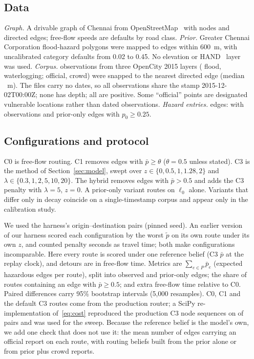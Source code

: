 \documentclass[conference]{IEEEtran}
\begin{document}
\subsection{Data}
\emph{Graph.} A drivable graph of Chennai from OpenStreetMap~\cite{haklay2008osm} with \NNodes{} nodes and \NEdges{} directed edges; free-flow speeds are defaults by road class.
\emph{Prior.} \NZones{} Greater Chennai Corporation flood-hazard polygons were mapped to edges within 600~m, with uncalibrated category defaults from 0.02 to 0.45. No elevation or HAND~\cite{nobre2011hand} layer was used.
\emph{Corpus.} \NObs{} observations from three OpenCity 2015 layers (\NFlood{} flood, \NWater{} waterlogging; \NOfficial{} official, \NCrowd{} crowd) were snapped to the nearest directed edge (median \SnapMed~m). The files carry no dates, so all observations share the stamp 2015-12-02T00:00Z; none has depth; all are positive. Some ``official'' points are designated vulnerable locations rather than dated observations.
\emph{Hazard entries.} \NHazEdges{} edges: \NObsEdges{} with observations and \NPriorEdges{} prior-only edges with $p_0\ge0.25$.

\subsection{Configurations and protocol}
C0 is free-flow routing. C1 removes edges with $\bar p\ge\theta$ ($\theta=0.5$ unless stated). C3 is the method of Section~\ref{sec:model}, swept over $z\in\{0,0.5,1,1.28,2\}$ and $\lambda\in\{0.3,1,2,5,10,20\}$. The hybrid removes edges with $\bar p>0.5$ and adds the C3 penalty with $\lambda=5$, $z=0$. A prior-only variant routes on $\ell_0$ alone. Variants that differ only in decay coincide on a single-timestamp corpus and appear only in the calibration study.

We used the harness's \NOD{} origin--destination pairs (pinned seed). An earlier version of our harness scored each configuration by the worst $\tilde p$ on its own route under its own $z$, and counted penalty seconds as travel time; both make configurations incomparable. Here every route is scored under one reference belief (C3 $\bar p$ at the replay clock), and detours are in free-flow time. Metrics are $\sum_{e\in P}\bar p_e$ (expected hazardous edges per route), split into observed and prior-only edges; the share of routes containing an edge with $\bar p\ge0.5$; and extra free-flow time relative to C0. Paired differences carry 95\% bootstrap intervals (5,000 resamples). C0, C1 and the default C3 routes come from the production router; a SciPy re-implementation of~\eqref{eq:cost} reproduced the production C3 node sequences on \ValPaths{} of \NOD{} pairs and was used for the sweep. Because the reference belief is the model's own, we add one check that does not use it: the mean number of edges carrying an official report on each route, with routing beliefs built from the prior alone or from prior plus crowd reports.
\end{document}
